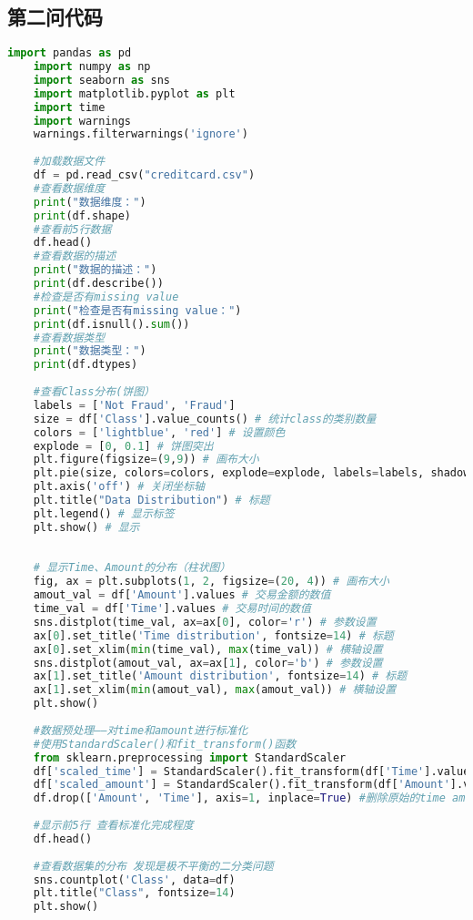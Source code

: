 \documentclass[a4paper,12pt]{article}
\begin{document}
\subsection{第二问代码}
\begin{lstlisting}[language=python, breaklines]
	import pandas as pd
	import numpy as np
	import seaborn as sns
	import matplotlib.pyplot as plt
	import time
	import warnings
	warnings.filterwarnings('ignore')
	
	#加载数据文件
	df = pd.read_csv("creditcard.csv")
	#查看数据维度
	print("数据维度：")
	print(df.shape)
	#查看前5行数据
	df.head()
	#查看数据的描述
	print("数据的描述：")
	print(df.describe())
	#检查是否有missing value
	print("检查是否有missing value：")
	print(df.isnull().sum())
	#查看数据类型
	print("数据类型：")
	print(df.dtypes)
	
	#查看Class分布(饼图）
	labels = ['Not Fraud', 'Fraud']
	size = df['Class'].value_counts() # 统计class的类别数量
	colors = ['lightblue', 'red'] # 设置颜色
	explode = [0, 0.1] # 饼图突出
	plt.figure(figsize=(9,9)) # 画布大小
	plt.pie(size, colors=colors, explode=explode, labels=labels, shadow=False, autopct='%.2f%%') #参数设置
	plt.axis('off') # 关闭坐标轴
	plt.title("Data Distribution") # 标题
	plt.legend() # 显示标签
	plt.show() # 显示
	
	
	# 显示Time、Amount的分布（柱状图）
	fig, ax = plt.subplots(1, 2, figsize=(20, 4)) # 画布大小
	amout_val = df['Amount'].values # 交易金额的数值
	time_val = df['Time'].values # 交易时间的数值
	sns.distplot(time_val, ax=ax[0], color='r') # 参数设置
	ax[0].set_title('Time distribution', fontsize=14) # 标题
	ax[0].set_xlim(min(time_val), max(time_val)) # 横轴设置
	sns.distplot(amout_val, ax=ax[1], color='b') # 参数设置
	ax[1].set_title('Amount distribution', fontsize=14) # 标题
	ax[1].set_xlim(min(amout_val), max(amout_val)) # 横轴设置
	plt.show()
	
	#数据预处理——对time和amount进行标准化
	#使用StandardScaler()和fit_transform()函数
	from sklearn.preprocessing import StandardScaler
	df['scaled_time'] = StandardScaler().fit_transform(df['Time'].values.reshape(-1,1))
	df['scaled_amount'] = StandardScaler().fit_transform(df['Amount'].values.reshape(-1,1))
	df.drop(['Amount', 'Time'], axis=1, inplace=True) #删除原始的time amount列
	
	#显示前5行 查看标准化完成程度
	df.head()
	
	#查看数据集的分布 发现是极不平衡的二分类问题
	sns.countplot('Class', data=df)
	plt.title("Class", fontsize=14)
	plt.show()
	

\end{lstlisting}
\end{document}
